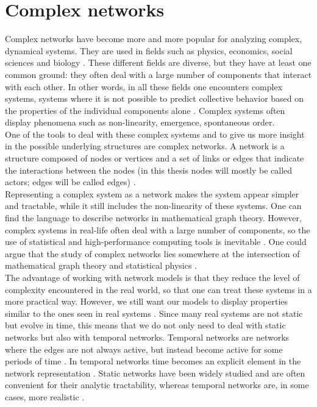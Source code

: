 \documentclass[11 pt , letterpaper , twoside , openright]{book}
\begin{document}
\section{Complex networks}\label{complNet}

Complex networks have become more and more popular for analyzing complex, dynamical systems. They are used in fields such as physics, economics, social sciences and biology \cite{Costa2008}. These different fields are diverse, but they have at least one common ground: they often deal with a large number of components that interact with each other. In other words, in all these fields one encounters complex systems, systems where it is not possible to predict collective behavior based on the properties of the individual components alone \cite{Mata2020}. Complex systems often display phenomena such as non-linearity, emergence, spontaneous order.
\\
\newline
One of the tools to deal with these complex systems and to give us more insight in the possible underlying structures are complex networks. A network is a structure composed of nodes or vertices and a set of links or edges that indicate the interactions between the nodes (in this thesis nodes will mostly be called actors; edges will be called edges) \cite{Mata2020}.\\
\newline
Representing a complex system as a network makes the system appear simpler and tractable, while it still includes the non-linearity of these systems. One can find the language to describe networks in mathematical graph theory. However, complex systems in real-life often deal with a large number of components, so the use of statistical and high-performance computing tools is inevitable \cite{Mata2020}. One could argue that the study of complex networks lies somewhere at the intersection of mathematical graph theory and statistical physics \cite{F.Costa2007}.\\
\newline
The advantage of working with network models is that they reduce the level of complexity encountered in the real world, so that one can treat these systems in a more practical way. However, we still want our models to display properties similar to the ones seen in real systems \cite{Mata2020}. Since many real systems are not static but evolve in time, this means that we do not only need to deal with static networks but also with temporal networks. Temporal networks are networks where the edges are not always active, but instead become active for some periods of time \cite{Holme2012}. In temporal networks time becomes an explicit element in the network representation \cite{Holme2012}. Static networks have been widely studied and are often convenient for their analytic tractability, whereas temporal networks are, in some cases, more realistic \cite{Mata2020}.\\
\end{document}
